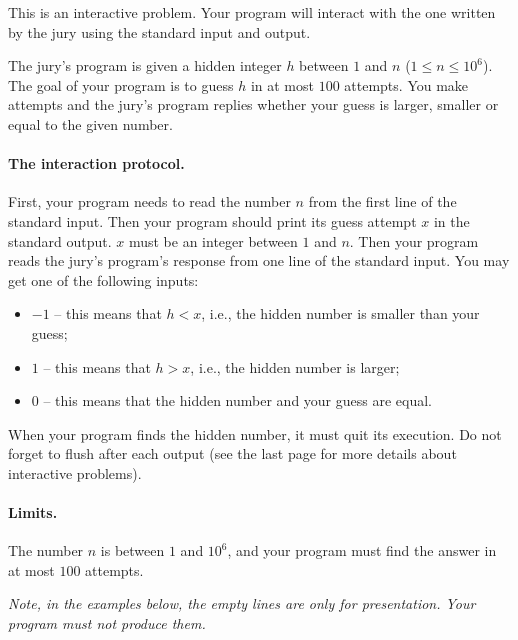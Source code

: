 This is an interactive problem.
Your program will interact with the one written by the jury using the standard input and output.

The jury’s program is given a hidden integer $h$ between $1$ and $n$ ($1 \leq n \leq 10^6$).
The goal of your program is to guess $h$ in at most $100$ attempts.
You make attempts and the jury's program replies whether your guess is larger, smaller or equal to the given number.

\paragraph{The interaction protocol.}
First, your program needs to read the number $n$ from the first line of the standard input.
Then your program should print its guess attempt $x$ in the standard output.
$x$ must be an integer between $1$ and $n$.
Then your program reads the jury’s program’s response from one line of the standard input.
You may get one of the following inputs:
\begin{itemize}
    \item $-1$ -- this means that $h < x$, i.e., the hidden number is smaller than your guess;
    \item $1$ -- this means that $h > x$, i.e., the hidden number is larger;
    \item $0$ -- this means that the hidden number and your guess are equal.
\end{itemize}
When your program finds the hidden number, it must quit its execution.
Do not forget to flush after each output (see the last page for more details about interactive problems).

\paragraph{Limits.}
The number $n$ is between $1$ and $10^6$, and your program must find the answer in at most $100$ attempts.

\emph{Note, in the examples below, the empty lines are only for presentation.
Your program must not produce them.}
{
\renewcommand{\sampleinputname}{Jury's feedback}
\renewcommand{\sampleoutputname}{Your attempts}
}
